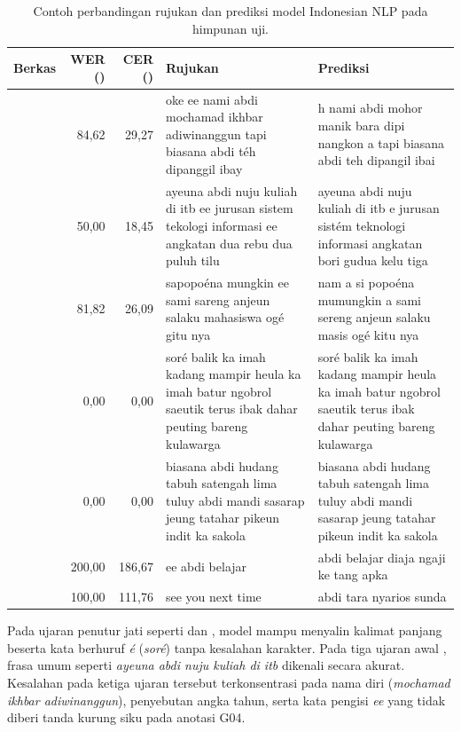 \clearpage
\begin{table}[!htbp]
  \centering\small
  \caption{Contoh perbandingan rujukan dan prediksi model Indonesian NLP pada himpunan uji.}
  \label{tab:contoh-uji}
  \begin{tabularx}{\textwidth}{@{}lrrYY@{}}
    \toprule
    Berkas & WER (\pct{}) & CER (\pct{}) & Rujukan & Prediksi \\
    \midrule
     & 84,62 & 29,27 & oke ee nami abdi mochamad ikhbar adiwinanggun tapi biasana abdi téh dipanggil ibay & h nami abdi mohor manik bara dipi nangkon a tapi biasana abdi teh dipangil ibai \\
     & 50,00 & 18,45 & ayeuna abdi nuju kuliah di itb ee jurusan sistem tekologi informasi ee angkatan dua rebu dua puluh tilu & ayeuna abdi nuju kuliah di itb e jurusan sistém teknologi informasi angkatan bori gudua kelu tiga \\
     & 81,82 & 26,09 & sapopoéna mungkin ee sami sareng anjeun salaku mahasiswa ogé gitu nya & nam a si popoéna mumungkin a sami sereng anjeun salaku masis ogé kitu nya \\
    \midrule
     & 0,00 & 0,00 & soré balik ka imah kadang mampir heula ka imah batur ngobrol saeutik terus ibak dahar peuting bareng kulawarga & soré balik ka imah kadang mampir heula ka imah batur ngobrol saeutik terus ibak dahar peuting bareng kulawarga \\
     & 0,00 & 0,00 & biasana abdi hudang tabuh satengah lima tuluy abdi mandi sasarap jeung tatahar pikeun indit ka sakola & biasana abdi hudang tabuh satengah lima tuluy abdi mandi sasarap jeung tatahar pikeun indit ka sakola \\
    \midrule
     & 200,00 & 186,67 & ee abdi belajar & abdi belajar diaja ngaji ke tang apka \\
     & 100,00 & 111,76 & see you next time & abdi tara nyarios sunda \\
    \bottomrule
  \end{tabularx}
\end{table}

Pada ujaran penutur jati seperti  dan , model mampu menyalin kalimat panjang beserta kata berhuruf \textit{é} (\textit{soré}) tanpa kesalahan karakter. Pada tiga ujaran awal , frasa umum seperti \textit{ayeuna abdi nuju kuliah di itb} dikenali secara akurat. Kesalahan pada ketiga ujaran tersebut terkonsentrasi pada nama diri (\textit{mochamad ikhbar adiwinanggun}), penyebutan angka tahun, serta kata pengisi \textit{ee} yang tidak diberi tanda kurung siku pada anotasi G04.

